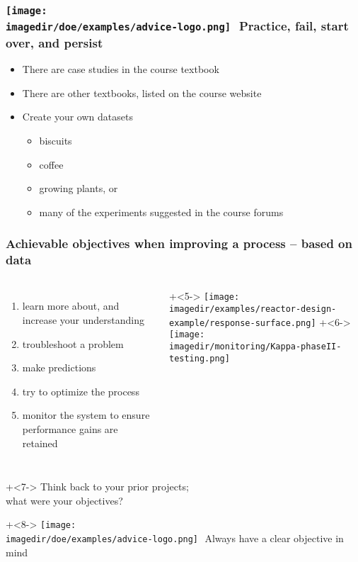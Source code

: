 \documentclass[handout,11pt,aspectratio=169,mathserif]{beamer}
\begin{document}
\begin{frame}\frametitle{\texttt{[image: \\imagedir/doe/examples/advice-logo.png]}\,\, Practice, fail, start over, and persist}

	\begin{itemize}
		\item	There are case studies in the course textbook
		\item	There are other textbooks, listed on the course website
		\item	Create your own datasets
			\begin{itemize}
				\item	biscuits
				\item	coffee
				\item	growing plants, or
				\item	many of the experiments suggested in the course forums
				
			\end{itemize}
	\end{itemize}
\end{frame}






\begin{frame}\frametitle{Achievable objectives when improving a process -- based on data}
	\pause
	\begin{columns}[t]
			\begin{enumerate}
				\item	learn more about, and increase your understanding  \pause
				\item	troubleshoot a problem  \pause
				\item	make predictions  \pause
				\item	try to optimize the process  \pause
				\item	monitor the system to ensure performance gains are retained  \pause
			\end{enumerate}
	
			\onslide+<5->{
				\texttt{[image: \\imagedir/examples/reactor-design-example/response-surface.png]}
			}
			\onslide+<6->{
				\texttt{[image: \\imagedir/monitoring/Kappa-phaseII-testing.png]}
			}
			
	\end{columns}
	
	\vspace{-1cm}
	\onslide+<7->{
		Think back to your prior projects; \\what were your objectives?
	}

	\vspace{1cm}
	\onslide+<8->{
		\hfill \texttt{[image: \\imagedir/doe/examples/advice-logo.png]}
		\,\,{\color{blue}Always have a clear objective in mind}
	}
\end{frame}
\end{document}
